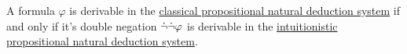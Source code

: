 \begin{theorem}\label{thm:glivenkos_double_negation_theorem}
  A formula \( \varphi \) is derivable in the \hyperref[def:classical_propositional_deduction_systems]{classical propositional natural deduction system} if and only if it's double negation \( \dot\neg \dot\neg \varphi \) is derivable in the \hyperref[def:intuitionistic_propositional_deduction_systems]{intuitionistic propositional natural deduction system}.
\end{theorem}
